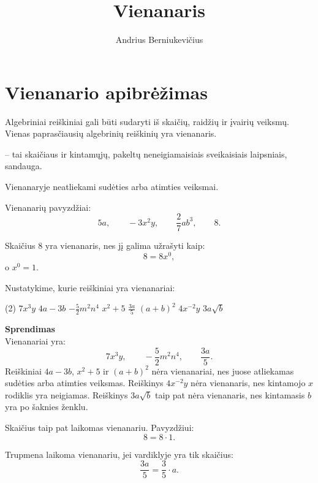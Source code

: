 \documentclass[11pt,a4paper]{scrartcl}
\title{Vienanaris}
\author{Andrius Berniukevičius}
\begin{document}
\maketitle

\section{Vienanario apibrėžimas}

Algebriniai reiškiniai gali būti sudaryti iš skaičių, raidžių ir įvairių veiksmų. Vienas paprasčiausių algebrinių reiškinių yra vienanaris.

\begin{definition}
 -- tai skaičiaus ir kintamųjų, pakeltų neneigiamaisiais sveikaisiais laipsniais, sandauga.

Vienanaryje neatliekami sudėties arba atimties veiksmai.
\end{definition}

Vienanarių pavyzdžiai:
\[
5a, \qquad -3x^2y, \qquad \frac{2}{7}ab^3, \qquad 8.
\]

\begin{remark}
Skaičius $8$ yra vienanaris, nes jį galima užrašyti kaip:
\[
8=8x^0,
\]
o $x^0=1$.
\end{remark}

\begin{example}
Nustatykime, kurie reiškiniai yra vienanariai:

\begin{tasks}[style=itemize](2)
    \task $7x^3y$
    \task $4a-3b$
    \task $-\frac{5}{2}m^2n^4$
    \task $x^2+5$
    \task $\frac{3a}{5}$
    \task $(a+b)^2$
    \task $4x^{-2}y$
    \task $3a\sqrt{b}$
\end{tasks}
\textbf{Sprendimas}\\
Vienanariai yra:
\[
7x^3y, \qquad -\frac{5}{2}m^2n^4, \qquad \frac{3a}{5}.
\]
Reiškiniai $4a-3b$, $x^2+5$ ir $(a+b)^2$ nėra vienanariai, nes juose atliekamas sudėties arba atimties veiksmas. Reiškinys $4x^{-2}y$ nėra vienanaris, nes kintamojo $x$ rodiklis yra neigiamas. Reiškinys $3a\sqrt{b}$ taip pat nėra vienanaris, nes kintamasis $b$ yra po šaknies ženklu.
\end{example}

\begin{remark}
Skaičius taip pat laikomas vienanariu. Pavyzdžiui:
\[
8=8 \cdot 1.
\]

Trupmena laikoma vienanariu, jei vardiklyje yra tik skaičius:
\[
\frac{3a}{5}=\frac{3}{5}\cdot a.
\]
\end{remark}
\end{document}
